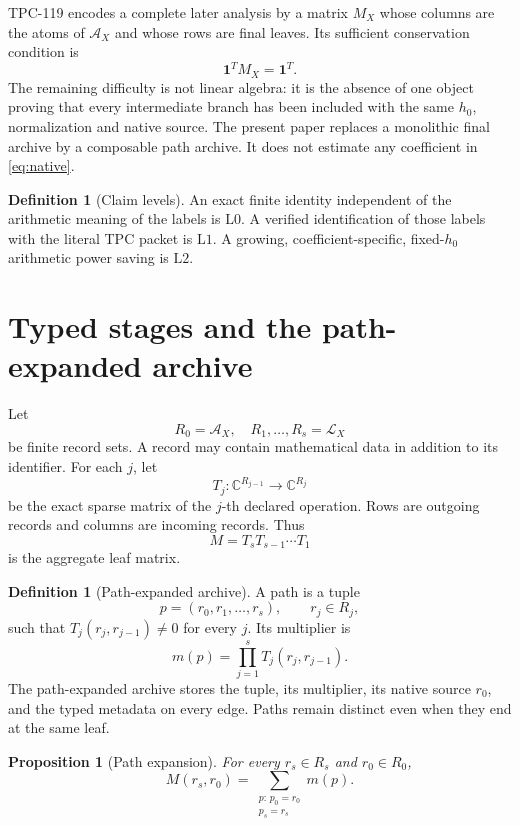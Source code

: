 \documentclass[11pt]{article}
\newtheorem{proposition}[theorem]{Proposition}
\theoremstyle{definition}
\newtheorem{definition}[theorem]{Definition}
\theoremstyle{remark}
\newcommand{\C}{\mathbb C}
\newcommand{\cA}{\mathcal A}
\newcommand{\cL}{\mathcal L}
\newcommand{\one}{\mathbf 1}
\newcommand{\Lzero}{\mathrm{L0}}
\newcommand{\Lone}{\mathrm{L1}}
\newcommand{\Ltwo}{\mathrm{L2}}
\begin{document}
TPC-119 encodes a complete later analysis by a matrix \(M_X\) whose
columns are the atoms of \(\cA_X\) and whose rows are final leaves.
Its sufficient conservation condition is
\begin{equation}
 \one^TM_X=\one^T.
 \label{eq:global-conservation}
\end{equation}
The remaining difficulty is not linear algebra: it is the absence of
one object proving that every intermediate branch has been included
with the same \(h_0\), normalization and native source.  The present
paper replaces a monolithic final archive by a composable path
archive.  It does not estimate any coefficient in
\eqref{eq:native}.

\begin{definition}[Claim levels]
An exact finite identity independent of the arithmetic meaning of
the labels is \(\Lzero\).  A verified identification of those labels
with the literal TPC packet is \(\Lone\).  A growing,
coefficient-specific, fixed-\(h_0\) arithmetic power saving is
\(\Ltwo\).
\end{definition}

\section{Typed stages and the path-expanded archive}

Let
\[
 R_0=\cA_X,\quad R_1,\ldots,R_s=\cL_X
\]
be finite record sets.  A record may contain mathematical data in
addition to its identifier.  For each \(j\), let
\[
 T_j:\C^{R_{j-1}}\longrightarrow\C^{R_j}
\]
be the exact sparse matrix of the \(j\)-th declared operation.  Rows
are outgoing records and columns are incoming records.  Thus
\[
 M=T_sT_{s-1}\cdots T_1
\]
is the aggregate leaf matrix.

\begin{definition}[Path-expanded archive]
A path is a tuple
\[
 p=(r_0,r_1,\ldots,r_s),\qquad r_j\in R_j,
\]
such that \(T_j(r_j,r_{j-1})\ne0\) for every \(j\).  Its multiplier is
\[
 m(p)=\prod_{j=1}^sT_j(r_j,r_{j-1}).
\]
The path-expanded archive stores the tuple, its multiplier, its
native source \(r_0\), and the typed metadata on every edge.  Paths
remain distinct even when they end at the same leaf.
\end{definition}

\begin{proposition}[Path expansion]
\label{prop:path}
For every \(r_s\in R_s\) and \(r_0\in R_0\),
\[
 M(r_s,r_0)
 =
 \sum_{\substack{p:\,p_0=r_0\\p_s=r_s}}m(p).
\]
\end{proposition}
\end{document}
